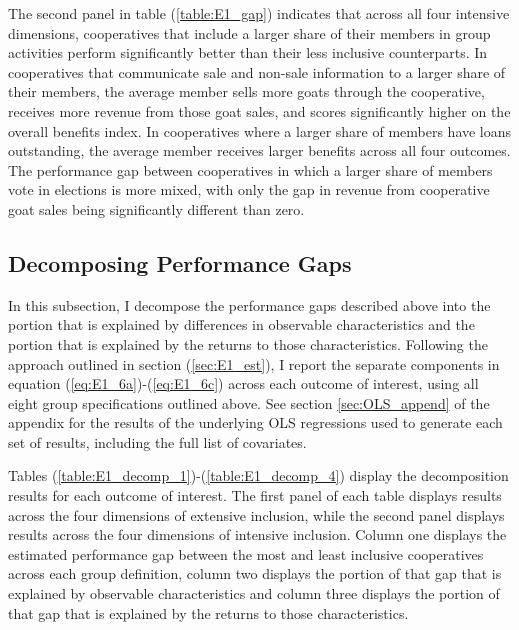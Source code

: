 \documentclass[11pt]{article}
\begin{document}
The second panel in table (\ref{table:E1_gap}) indicates that across all four intensive dimensions, cooperatives that include a larger share of their members in group activities perform significantly better than their less inclusive counterparts. In cooperatives that communicate sale and non-sale information to a larger share of their members, the average member sells more goats through the cooperative, receives more revenue from those goat sales, and scores significantly higher on the overall benefits index. In cooperatives where a larger share of members have loans outstanding, the average member receives larger benefits across all four outcomes. The performance gap between cooperatives in which a larger share of members vote in elections is more mixed, with only the gap in revenue from cooperative goat sales being significantly different than zero. 


\subsection{Decomposing Performance Gaps}

In this subsection, I decompose the performance gaps described above into the portion that is explained by differences in observable characteristics and the portion that is explained by the returns to those characteristics. Following the approach outlined in section (\ref{sec:E1_est}), I report the separate components in equation (\ref{eq:E1_6a})-(\ref{eq:E1_6c}) across each outcome of interest, using all eight group specifications outlined above. See section \ref{sec:OLS_append} of the appendix for the results of the underlying OLS regressions used to generate each set of results, including the full list of covariates.

Tables (\ref{table:E1_decomp_1})-(\ref{table:E1_decomp_4}) display the decomposition results for each outcome of interest. The first panel of each table displays results across the four dimensions of extensive inclusion, while the second panel displays results across the four dimensions of intensive inclusion. Column one displays the estimated performance gap between the most and least inclusive cooperatives across each group definition, column two displays the portion of that gap that is explained by observable characteristics and column three displays the portion of that gap that is explained by the returns to those characteristics. 
\end{document}
